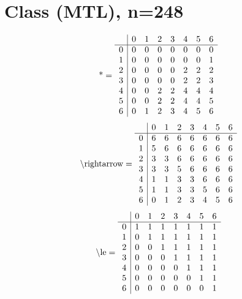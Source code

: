 \documentclass[11pt]{article}
\begin{document}
\section{Class (MTL), n=248}
\[\text{*} = 
\begin{array}{r | r r r r r r r}
 & 0 & 1 & 2 & 3 & 4 & 5 & 6 \\ \hline
0 & 0 & 0 & 0 & 0 & 0 & 0 & 0 \\
1 & 0 & 0 & 0 & 0 & 0 & 0 & 1 \\
2 & 0 & 0 & 0 & 0 & 2 & 2 & 2 \\
3 & 0 & 0 & 0 & 0 & 2 & 2 & 3 \\
4 & 0 & 0 & 2 & 2 & 4 & 4 & 4 \\
5 & 0 & 0 & 2 & 2 & 4 & 4 & 5 \\
6 & 0 & 1 & 2 & 3 & 4 & 5 & 6 \\
\end{array}
\]
\[\text{\textbackslash rightarrow} = 
\begin{array}{r | r r r r r r r}
 & 0 & 1 & 2 & 3 & 4 & 5 & 6 \\ \hline
0 & 6 & 6 & 6 & 6 & 6 & 6 & 6 \\
1 & 5 & 6 & 6 & 6 & 6 & 6 & 6 \\
2 & 3 & 3 & 6 & 6 & 6 & 6 & 6 \\
3 & 3 & 3 & 5 & 6 & 6 & 6 & 6 \\
4 & 1 & 1 & 3 & 3 & 6 & 6 & 6 \\
5 & 1 & 1 & 3 & 3 & 5 & 6 & 6 \\
6 & 0 & 1 & 2 & 3 & 4 & 5 & 6 \\
\end{array}
\]
\[\text{\textbackslash le} = 
\begin{array}{r | r r r r r r r}
 & 0 & 1 & 2 & 3 & 4 & 5 & 6 \\ \hline
0 & 1 & 1 & 1 & 1 & 1 & 1 & 1 \\
1 & 0 & 1 & 1 & 1 & 1 & 1 & 1 \\
2 & 0 & 0 & 1 & 1 & 1 & 1 & 1 \\
3 & 0 & 0 & 0 & 1 & 1 & 1 & 1 \\
4 & 0 & 0 & 0 & 0 & 1 & 1 & 1 \\
5 & 0 & 0 & 0 & 0 & 0 & 1 & 1 \\
6 & 0 & 0 & 0 & 0 & 0 & 0 & 1 \\
\end{array}
\]
\end{document}
